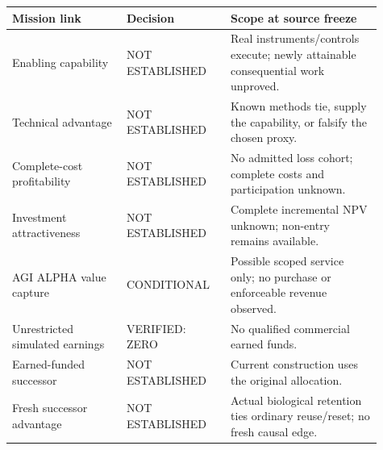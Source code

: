 \documentclass[11pt,letterpaper]{article}
\begin{document}
\begingroup\small\begin{longtable}{>{\raggedright\arraybackslash}p{0.29\linewidth}>{\raggedright\arraybackslash}p{0.25\linewidth}>{\raggedright\arraybackslash}p{0.37\linewidth}}\toprule
\textbf{Mission link} & \textbf{Decision} & \textbf{Scope at source freeze}\\\midrule\endhead
Enabling capability & NOT ESTABLISHED & Real instruments/controls execute; newly attainable consequential work unproved.\\
Technical advantage & NOT ESTABLISHED & Known methods tie, supply the capability, or falsify the chosen proxy.\\
Complete-cost profitability & NOT ESTABLISHED & No admitted loss cohort; complete costs and participation unknown.\\
Investment attractiveness & NOT ESTABLISHED & Complete incremental NPV unknown; non-entry remains available.\\
AGI ALPHA value capture & CONDITIONAL & Possible scoped service only; no purchase or enforceable revenue observed.\\
Unrestricted simulated earnings & VERIFIED: ZERO & No qualified commercial earned funds.\\
Earned-funded successor & NOT ESTABLISHED & Current construction uses the original allocation.\\
Fresh successor advantage & NOT ESTABLISHED & Actual biological retention ties ordinary reuse/reset; no fresh causal edge.\\
\bottomrule\end{longtable}\endgroup
\end{document}
